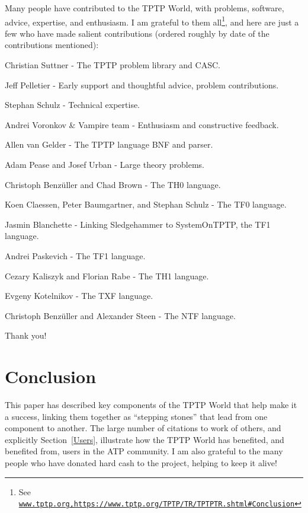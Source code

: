 \documentclass[runningheads]{llncs}
\newenvironment{packed_itemize}{
\vspace*{-0.2em}
\begin{itemize}
\setlength{\partopsep}{0pt}
\setlength{\itemsep}{1pt}
\setlength{\parskip}{0pt}
\setlength{\parsep}{0pt}
}{\end{itemize}}
\begin{document}
Many people have contributed to the TPTP World, with problems, software, advice, expertise,
and enthusiasm. 
I am grateful to them all\footnote{%
See \href{http://www.tptp.org,https://www.tptp.org/TPTP/TR/TPTPTR.shtml\#Conclusion}{{\tt www.tptp.org,https://www.tptp.org/TPTP/TR/TPTPTR.shtml\#Conclusion}}}, 
and here are just a few who have made salient contributions (ordered roughly by date of the 
contributions mentioned):
\begin{packed_itemize}
\item Christian Suttner - The TPTP problem library and CASC.                 %
\item Jeff Pelletier - Early support and thoughtful advice, problem contributions. %
\item Stephan Schulz - Technical expertise.                                      %
\item Andrei Voronkov \& Vampire team - Enthusiasm and constructive feedback.  %
\item Allen van Gelder - The TPTP language BNF and parser.                    %
\item Adam Pease and Josef Urban - Large theory problems.                     %
\item Christoph Benz{\"u}ller and Chad Brown - The TH0 language.              %
\item Koen Claessen, Peter Baumgartner, and Stephan Schulz - The TF0 language. %
\item Jasmin Blanchette - Linking Sledgehammer to SystemOnTPTP, the TF1 language.     %
\item Andrei Paskevich - The TF1 language.                                    %
\item Cezary Kaliszyk and Florian Rabe - The TH1 language.                    %
\item Evgeny Kotelnikov - The TXF language.                                   %
\item Christoph Benz{\"u}ller and Alexander Steen - The NTF language.         %
\end{packed_itemize}
Thank you!

\section{Conclusion}
\label{Conclusion}

This paper has described key components of the TPTP World that help make it a success,
linking them together as ``stepping stones'' that lead from one component to another.
The large number of citations to work of others, and explicitly Section~\ref{Users}, 
illustrate how the TPTP World has benefited, and benefited from, users in the ATP community.
I am also grateful to the many people who have donated hard cash to the project, helping
to keep it alive!
\end{document}
